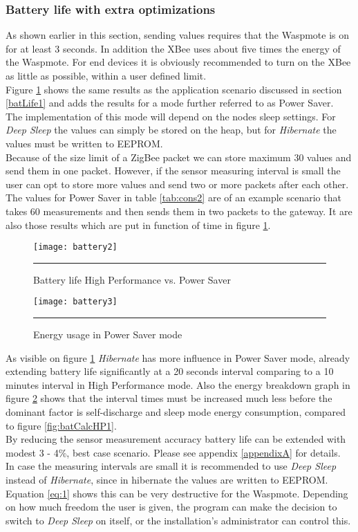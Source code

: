\subsubsection{Battery life with extra optimizations}
As shown earlier in this section, sending values requires that the Waspmote is on for at least 3 seconds. In addition the XBee uses about five times the energy of the Waspmote. For end devices it is obviously recommended to turn on the XBee as little as possible, within a user defined limit.\\ Figure \ref{fig:batCalcPS} shows the same results as the application scenario discussed in section \ref{batLife1} and adds the results for a mode further referred to as Power Saver.\\
The implementation of this mode will depend on the nodes sleep settings. For \textit{Deep Sleep} the values can simply be stored on the heap, but for \textit{Hibernate} the values must be written to EEPROM.\\
Because of the size limit of a ZigBee packet we can store maximum 30 values and send them in one packet. However, if the sensor measuring interval is small the user can opt to store more values and send two or more packets after each other. The values for Power Saver in table \ref{tab:cons2} are of an example scenario that takes 60 measurements and then sends them in two packets to the gateway. It are also those results which are put in function of time in figure \ref{fig:batCalcPS}.\\

\begin{figure}[htbp]
\centering
\texttt{[image: battery2]}
\rule{30em}{0.5pt}
\caption{Battery life High Performance vs. Power Saver}
\label{fig:batCalcPS}
\end{figure}\bigskip
\begin{figure}[htbp]
\centering
\texttt{[image: battery3]}
\rule{30em}{0.5pt}
\caption{Energy usage in Power Saver mode}
\label{fig:batCalcPS1}
\end{figure}

As visible on figure \ref{fig:batCalcPS} \textit{Hibernate} has more influence in Power Saver mode, already extending battery life significantly at a 20 seconds interval comparing to a 10 minutes interval in High Performance mode. Also the energy breakdown graph in figure \ref{fig:batCalcPS1} shows that the interval times must be increased much less before the dominant factor is self-discharge and sleep mode energy consumption, compared to figure \ref{fig:batCalcHP1}.\\By reducing the sensor measurement accuracy battery life can be extended with modest 3 - 4\%, best case scenario. Please see appendix \ref{appendixA} for details.\\
In case the measuring intervals are small it is recommended to use \textit{Deep Sleep} instead of \textit{Hibernate}, since in hibernate the values are written to EEPROM. Equation \ref{eq:1} shows this can be very destructive for the Waspmote. Depending on how much freedom the user is given, the program can make the decision to switch to \textit{Deep Sleep} on itself, or the installation's administrator can control this.